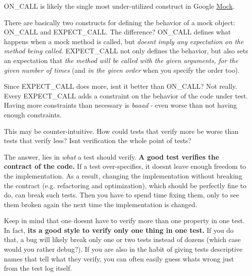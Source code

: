 {\ttfamily O\+N\+\_\+\+C\+A\+LL} is likely the single most under-\/utilized construct in Google \hyperlink{class_mock}{Mock}.

There are basically two constructs for defining the behavior of a mock object\+: {\ttfamily O\+N\+\_\+\+C\+A\+LL} and {\ttfamily E\+X\+P\+E\+C\+T\+\_\+\+C\+A\+LL}. The difference? {\ttfamily O\+N\+\_\+\+C\+A\+LL} defines what happens when a mock method is called, but {\itshape doesn\textquotesingle{}t imply any expectation on the method being called.} {\ttfamily E\+X\+P\+E\+C\+T\+\_\+\+C\+A\+LL} not only defines the behavior, but also sets an expectation that {\itshape the method will be called with the given arguments, for the given number of times} (and {\itshape in the given order} when you specify the order too).

Since {\ttfamily E\+X\+P\+E\+C\+T\+\_\+\+C\+A\+LL} does more, isn\textquotesingle{}t it better than {\ttfamily O\+N\+\_\+\+C\+A\+LL}? Not really. Every {\ttfamily E\+X\+P\+E\+C\+T\+\_\+\+C\+A\+LL} adds a constraint on the behavior of the code under test. Having more constraints than necessary is {\itshape baaad} -\/ even worse than not having enough constraints.

This may be counter-\/intuitive. How could tests that verify more be worse than tests that verify less? Isn\textquotesingle{}t verification the whole point of tests?

The answer, lies in {\itshape what} a test should verify. {\bfseries A good test verifies the contract of the code.} If a test over-\/specifies, it doesn\textquotesingle{}t leave enough freedom to the implementation. As a result, changing the implementation without breaking the contract (e.\+g. refactoring and optimization), which should be perfectly fine to do, can break such tests. Then you have to spend time fixing them, only to see them broken again the next time the implementation is changed.

Keep in mind that one doesn\textquotesingle{}t have to verify more than one property in one test. In fact, {\bfseries it\textquotesingle{}s a good style to verify only one thing in one test.} If you do that, a bug will likely break only one or two tests instead of dozens (which case would you rather debug?). If you are also in the habit of giving tests descriptive names that tell what they verify, you can often easily guess what\textquotesingle{}s wrong just from the test log itself.

